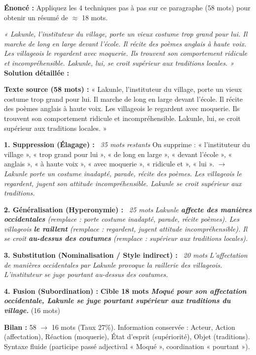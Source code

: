 \documentclass[11pt]{article}
\begin{document}
\begin{exoresolu}
    \textbf{Énoncé :} Appliquez les 4 techniques pas à pas sur ce paragraphe (58 mots) pour obtenir un résumé de $\approx$ 18 mots.
    
    \textit{« Lakunle, l'instituteur du village, porte un vieux costume trop grand pour lui. Il marche de long en large devant l'école. Il récite des poèmes anglais à haute voix. Les villageois le regardent avec moquerie. Ils trouvent son comportement ridicule et incompréhensible. Lakunle, lui, se croit supérieur aux traditions locales. »}
    \tcblower
    \textbf{Solution détaillée :}
    
    \textbf{Texte source (58 mots) :} « Lakunle, l'instituteur du village, porte un vieux costume trop grand pour lui. Il marche de long en large devant l'école. Il récite des poèmes anglais à haute voix. Les villageois le regardent avec moquerie. Ils trouvent son comportement ridicule et incompréhensible. Lakunle, lui, se croit supérieur aux traditions locales. »
    
    \textbf{1. Suppression (Élagage) :} \textit{~35 mots restants}
    On supprime : « l'instituteur du village », « trop grand pour lui », « de long en large », « devant l'école », « anglais », « à haute voix », « avec moquerie », « ridicule et », « lui ».
    $\rightarrow$ \emph{Lakunle porte un costume inadapté, parade, récite des poèmes. Les villageois le regardent, jugent son attitude incompréhensible. Lakunle se croit supérieur aux traditions.}
    
    \textbf{2. Généralisation (Hyperonymie) :} \textit{~25 mots}
    \emph{Lakunle \textbf{affecte des manières occidentales} (remplace : porte costume inadapté, parade, récite poèmes). Les villageois \textbf{le raillent} (remplace : regardent, jugent attitude incompréhensible). Il se croit \textbf{au-dessus des coutumes} (remplace : supérieur aux traditions locales).}
    
    \textbf{3. Substitution (Nominalisation / Style indirect) :} \textit{~20 mots}
    \emph{L'affectation de manières occidentales par Lakunle provoque la raillerie des villageois. L'instituteur se juge pourtant au-dessus des coutumes.}
    
    \textbf{4. Fusion (Subordination) :} \textbf{Cible 18 mots}
    \emph{\textbf{Moqué pour son affectation occidentale, Lakunle se juge pourtant supérieur aux traditions du village.}} (16 mots)
    
    \textbf{Bilan :} 58 $\rightarrow$ 16 mots (Taux 27\%). Information conservée : Acteur, Action (affectation), Réaction (moquerie), État d'esprit (supériorité), Objet (traditions). Syntaxe fluide (participe passé adjectival « Moqué », coordination « pourtant »).
\end{exoresolu}
\end{document}
